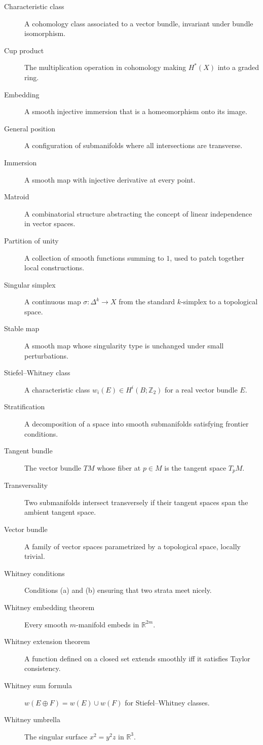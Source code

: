 \begin{description}
    \item[Characteristic class] A cohomology class associated to a vector bundle, invariant under bundle isomorphism.
    \item[Cup product] The multiplication operation in cohomology making $H^*(X)$ into a graded ring.
    \item[Embedding] A smooth injective immersion that is a homeomorphism onto its image.
    \item[General position] A configuration of submanifolds where all intersections are transverse.
    \item[Immersion] A smooth map with injective derivative at every point.
    \item[Matroid] A combinatorial structure abstracting the concept of linear independence in vector spaces.
    \item[Partition of unity] A collection of smooth functions summing to $1$, used to patch together local constructions.
    \item[Singular simplex] A continuous map $\sigma: \Delta^k \to X$ from the standard $k$-simplex to a topological space.
    \item[Stable map] A smooth map whose singularity type is unchanged under small perturbations.
    \item[Stiefel--Whitney class] A characteristic class $w_i(E) \in H^i(B; \mathbb{Z}_2)$ for a real vector bundle $E$.
    \item[Stratification] A decomposition of a space into smooth submanifolds satisfying frontier conditions.
    \item[Tangent bundle] The vector bundle $TM$ whose fiber at $p \in M$ is the tangent space $T_pM$.
    \item[Transversality] Two submanifolds intersect transversely if their tangent spaces span the ambient tangent space.
    \item[Vector bundle] A family of vector spaces parametrized by a topological space, locally trivial.
    \item[Whitney conditions] Conditions (a) and (b) ensuring that two strata meet nicely.
    \item[Whitney embedding theorem] Every smooth $m$-manifold embeds in $\mathbb{R}^{2m}$.
    \item[Whitney extension theorem] A function defined on a closed set extends smoothly iff it satisfies Taylor consistency.
    \item[Whitney sum formula] $w(E \oplus F) = w(E) \cup w(F)$ for Stiefel--Whitney classes.
    \item[Whitney umbrella] The singular surface $x^2 = y^2 z$ in $\mathbb{R}^3$.
\end{description}


